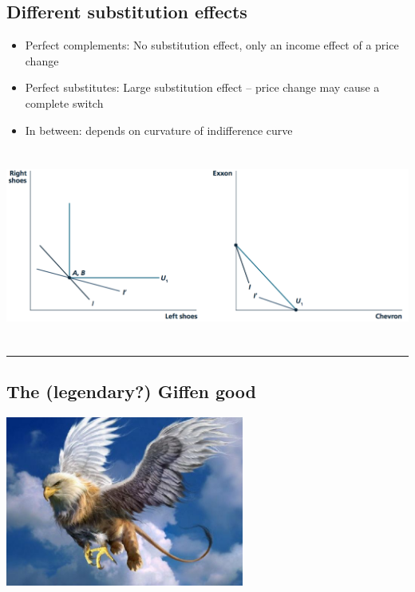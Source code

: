 \documentclass[]{article}
\providecommand{\tightlist}{%
  \setlength{\itemsep}{0pt}\setlength{\parskip}{0pt}}
\begin{document}
\hypertarget{different-substitution-effects}{%
\subsection{Different substitution effects}\label{different-substitution-effects}}

\begin{itemize}
\tightlist
\item
  Perfect complements: No substitution effect, only an income effect of a price change
\item
  Perfect substitutes: Large substitution effect -- price change may cause a complete switch
\item
  In between: depends on curvature of indifference curve
\end{itemize}

\includegraphics[height=2.5in]{picsfigs/substfxperfect_trim.png}

\begin{center}\rule{0.5\linewidth}{\linethickness}\end{center}

\hypertarget{the-legendary-giffen-good}{%
\subsection{The (legendary?) Giffen good}\label{the-legendary-giffen-good}}

\includegraphics[height=2.2in]{picsfigs/griffin.jpg}
\end{document}
